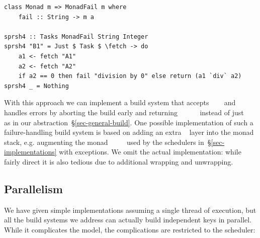\vspace{1mm}
\begin{verbatim}
class Monad m => MonadFail m where
    fail :: String -> m a

sprsh4 :: Tasks MonadFail String Integer
sprsh4 "B1" = Just $ Task $ \fetch -> do
    a1 <- fetch "A1"
    a2 <- fetch "A2"
    if a2 == 0 then fail "division by 0" else return (a1 `div` a2)
sprsh4 _ = Nothing
\end{verbatim}
\vspace{1mm}

\noindent
With this approach we can implement a build system that accepts
~~~ and handles errors by aborting the
build early and returning
~~~~~ instead of just
~~~ as in our 
abstraction~\S\ref{sec-general-build}. One possible implementation of such a
failure-handling build system is based on adding an extra
~ layer into the monad stack, e.g. augmenting the monad
~~~~ used by the schedulers
in~\S\ref{sec-implementations} with exceptions. We omit the actual
implementation: while fairly direct it is also tedious due to additional
wrapping and unwrapping.


\subsection{Parallelism}\label{sec-parallelism}

We have given simple implementations assuming a single thread of execution,
but all the build systems we address can actually build independent keys in
parallel. While it complicates the model, the complications are restricted
to the scheduler:

